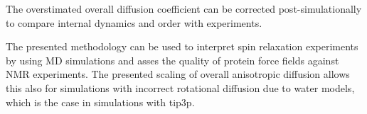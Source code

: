 \documentclass[pre,aps,floatfix,authordate1-4,twocolumn]{revtex4-1}
\begin{document}
The overstimated overall diffusion
coefficient can be corrected post-simulationally to compare internal dynamics
and order with experiments. 

The presented methodology can be used to interpret spin relaxation experiments
by using MD simulations \cite{??} and asses the quality of protein force fields
against NMR experiments. The presented scaling of overall anisotropic diffusion
allows this also for simulations with incorrect rotational diffusion due to water
models, which is the case in simulations with tip3p. 

\begin{acknowledgments}
\end{acknowledgments}


\end{document}
